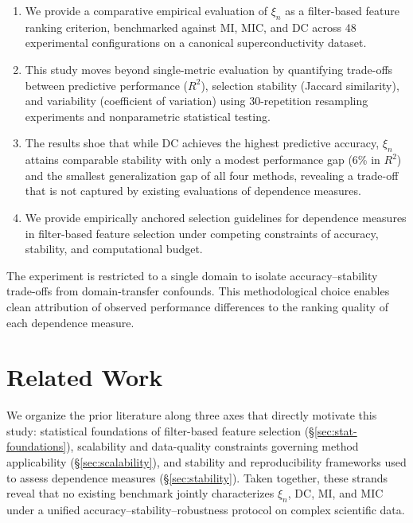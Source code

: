 \documentclass[twoside,11pt]{article}
\begin{document}
\begin{enumerate}

  \item  
  We provide a comparative empirical evaluation of $\xi_n$ as a
  filter-based feature ranking criterion, benchmarked against MI, MIC, and DC
  across 48 experimental configurations on a canonical superconductivity dataset.

  \item
  This study moves beyond single-metric evaluation by quantifying trade-offs between
  predictive performance ($R^2$), selection stability (Jaccard similarity),
  and variability (coefficient of variation) using 30-repetition resampling
  experiments and nonparametric statistical testing.

  \item
  The results shoe that while DC achieves the highest predictive accuracy,
  $\xi_n$ attains comparable stability with only a modest performance gap
  (6\% in $R^2$) and the smallest generalization gap of all four methods,
  revealing a trade-off that is not captured by existing evaluations of
  dependence measures.

  \item 
  We provide empirically anchored selection guidelines for dependence measures
  in filter-based feature selection under competing constraints of accuracy,
  stability, and computational budget.

\end{enumerate}

The experiment is restricted to a single domain to isolate accuracy--stability
trade-offs from domain-transfer confounds. This methodological choice enables
clean attribution of observed performance differences to the ranking quality of
each dependence measure.

\section{Related Work}
We organize the prior literature along three axes that directly motivate 
this study: statistical foundations of filter-based feature selection 
(\S\ref{sec:stat-foundations}), scalability and data-quality constraints 
governing method applicability (\S\ref{sec:scalability}), and stability 
and reproducibility frameworks used to assess dependence measures 
(\S\ref{sec:stability}). Taken together, these strands reveal that no 
existing benchmark jointly characterizes $\xi_n$, DC, MI, and MIC under 
a unified accuracy--stability--robustness protocol on complex 
scientific data.
\end{document}
